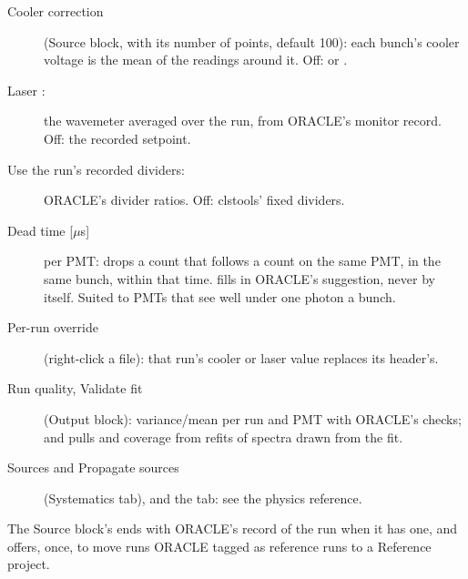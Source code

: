 \begin{description}
    \item[Cooler correction ] (Source block, with its
        number of points, default 100): each bunch's cooler voltage is
        the mean of the readings around it. Off:  or
        .
    \item[Laser :] the wavemeter averaged over the
        run, from ORACLE's monitor record. Off: the recorded setpoint.
    \item[Use the run's recorded dividers:] ORACLE's divider ratios.
        Off: clstools' fixed dividers.
    \item[Dead time {[$\mu$s]}] per PMT: drops a count that follows a
        count on the same PMT, in the same bunch, within that time.
         fills in ORACLE's suggestion, never by
        itself. Suited to PMTs that see well under one photon a bunch.
    \item[Per-run override] (right-click a file): that run's cooler or
        laser value replaces its header's.
    \item[Run quality, Validate fit] (Output block): variance/mean per
        run and PMT with ORACLE's checks; and pulls and coverage from
        refits of spectra drawn from the fit.
    \item[Sources and Propagate sources] (Systematics tab), and the
         tab: see the physics reference.
\end{description}

The Source block's  ends with ORACLE's record of the run when
it has one, and  offers, once, to move runs ORACLE tagged
as reference runs to a Reference project.
